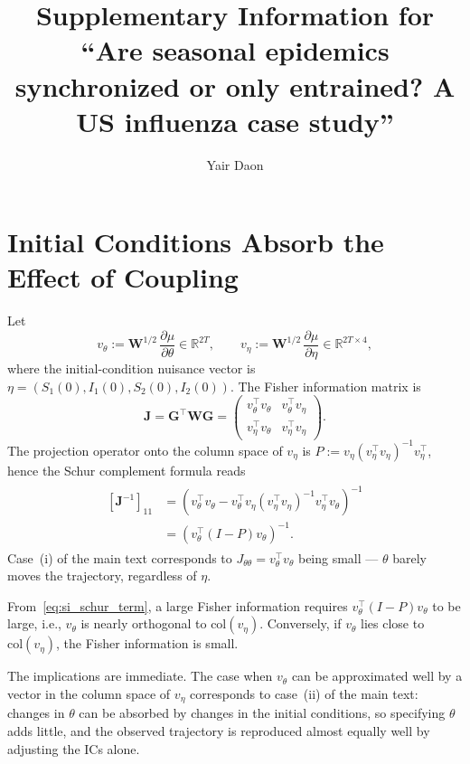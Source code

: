 \documentclass[12pt,letterpaper]{article}
\title{Supplementary Information for ``Are seasonal epidemics
  synchronized or only entrained? A US influenza case study''}
\author{Yair Daon}
\date{}
\begin{document}
\maketitle

\section{Initial Conditions Absorb the Effect of Coupling}\label{sec:si_schur}
Let
%
\[
  v_\theta := \mathbf{W}^{1/2}\,\frac{\partial\mu}{\partial\theta}
  \in \mathbb{R}^{2T},
  \qquad
  v_\eta := \mathbf{W}^{1/2}\,\frac{\partial\mu}{\partial\eta}
  \in \mathbb{R}^{2T\times 4},
\]
%
where the initial-condition nuisance vector is $\eta = (S_1(0),
I_1(0), S_2(0), I_2(0))$. The Fisher information matrix is
%
\[
  \mathbf{J} = \mathbf{G}^\top\mathbf{W}\mathbf{G}
  = \begin{pmatrix}
    v_\theta^\top v_\theta & v_\theta^\top v_\eta \\[3pt]
    v_\eta^\top v_\theta & v_\eta^\top v_\eta
  \end{pmatrix}.
\]
%
The projection operator onto the column space of $v_\eta$ is $P :=
v_\eta(v_\eta^\top v_\eta)^{-1}v_\eta^\top$, hence the
Schur complement formula reads
%
\begin{align}\label{eq:si_schur_term}
  \begin{split}
    [\mathbf{J}^{-1}]_{11} &= (v_\theta^{\top}v_\theta - v_\theta^\top v_\eta(v_\eta^\top v_\eta)^{-1}v_\eta^\top v_\theta)^{-1}\\
    &= (v_\theta^{\top} ( I-P ) v_\theta)^{-1}.
  \end{split}
\end{align}
Case~(i) of the main text corresponds to $J_{\theta\theta} =
v_\theta^\top v_\theta$ being small --- $\theta$ barely moves the
trajectory, regardless of $\eta$.

From~\eqref{eq:si_schur_term}, a large Fisher information requires
$v_\theta^\top(I-P)v_\theta$ to be large, i.e., $v_\theta$ is nearly
orthogonal to $\mathrm{col}(v_\eta)$.
Conversely, if $v_\theta$ lies close to $\mathrm{col}(v_\eta)$, the
Fisher information is small.

The implications are immediate. The case when $v_\theta$ can be
approximated well by a vector in the column space of $v_\eta$
corresponds to case~(ii) of the main text: changes in $\theta$ can be
absorbed by changes in the initial conditions, so specifying $\theta$
adds little, and the observed trajectory is reproduced almost equally
well by adjusting the ICs alone.
\end{document}
